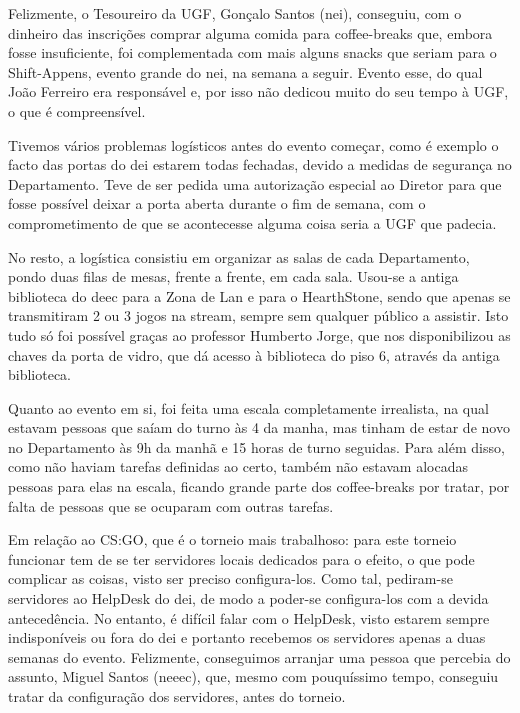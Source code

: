 Felizmente, o Tesoureiro da UGF, Gonçalo Santos (\acrshort{nei}), conseguiu, com o dinheiro das inscrições comprar alguma comida para coffee-breaks que, embora fosse insuficiente, foi complementada com mais alguns snacks que seriam para o Shift-Appens, evento grande do \acrshort{nei}, na semana a seguir. Evento esse, do qual João Ferreiro era responsável e, por isso não dedicou muito do seu tempo à UGF, o que é compreensível.

Tivemos vários problemas logísticos antes do evento começar, como é exemplo o facto das portas do \acrshort{dei} estarem todas fechadas, devido a medidas de segurança no Departamento. Teve de ser pedida uma autorização especial ao Diretor para que fosse possível deixar a porta aberta durante o fim de semana, com o comprometimento de que se acontecesse alguma coisa seria a UGF que padecia.

No resto, a logística consistiu em organizar as salas de cada Departamento, pondo duas filas de mesas, frente a frente, em cada sala. Usou-se a antiga biblioteca do \acrshort{deec} para a Zona de Lan e para o HearthStone, sendo que apenas se transmitiram 2 ou 3 jogos na stream, sempre sem qualquer público a assistir. Isto tudo só foi possível graças ao professor Humberto Jorge, que nos disponibilizou as chaves da porta de vidro, que dá acesso à biblioteca do piso 6, através da antiga biblioteca.

Quanto ao evento em si, foi feita uma escala completamente irrealista, na qual estavam pessoas que saíam do turno às 4 da manha, mas tinham de estar de novo no Departamento às 9h da manhã e 15 horas de turno seguidas. Para além disso, como não haviam tarefas definidas ao certo, também não estavam alocadas pessoas para elas na escala, ficando grande parte dos coffee-breaks por tratar, por falta de pessoas que se ocuparam com outras tarefas.

Em relação ao CS:GO, que é o torneio mais trabalhoso: para este torneio funcionar tem de se ter servidores locais dedicados para o efeito, o que pode complicar as coisas, visto ser preciso configura-los. Como tal, pediram-se servidores ao HelpDesk do \acrshort{dei}, de modo a poder-se configura-los com a devida antecedência. No entanto, é difícil falar com o HelpDesk, visto estarem sempre indisponíveis ou fora do \acrshort{dei} e portanto recebemos os servidores apenas a duas semanas do evento. Felizmente, conseguimos arranjar uma pessoa que percebia do assunto, Miguel Santos (\acrshort{neeec}), que, mesmo com pouquíssimo tempo, conseguiu tratar da configuração dos servidores, antes do torneio.

